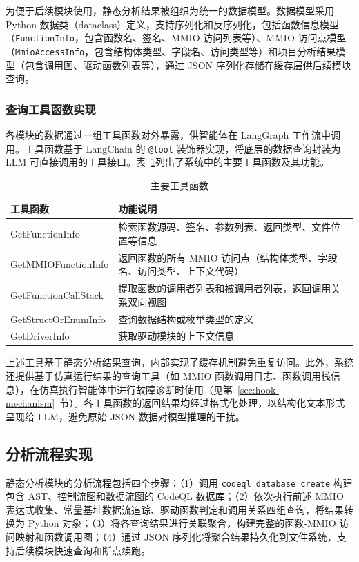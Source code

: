 为便于后续模块使用，静态分析结果被组织为统一的数据模型。数据模型采用 Python 数据类（dataclass）定义，支持序列化和反序列化，包括函数信息模型（\texttt{FunctionInfo}，包含函数名、签名、MMIO 访问列表等）、MMIO 访问点模型（\texttt{MmioAccessInfo}，包含结构体类型、字段名、访问类型等）和项目分析结果模型（包含调用图、驱动函数列表等），通过 JSON 序列化存储在缓存层供后续模块查询。

\subsubsection{查询工具函数实现}

各模块的数据通过一组工具函数对外暴露，供智能体在 LangGraph 工作流中调用。工具函数基于 LangChain 的 \texttt{@tool} 装饰器实现，将底层的数据查询封装为 LLM 可直接调用的工具接口。表~\ref{tab:tools}列出了系统中的主要工具函数及其功能。

\begin{table}[htbp]
\centering
\caption{主要工具函数}
\label{tab:tools}
\footnotesize
\setlength{\tabcolsep}{3pt}
\begin{tabular}{@{}lp{10.5cm}@{}}
\toprule
\textbf{工具函数} & \textbf{功能说明} \\
\midrule
GetFunctionInfo & 检索函数源码、签名、参数列表、返回类型、文件位置等信息 \\
GetMMIOFunctionInfo & 返回函数的所有 MMIO 访问点（结构体类型、字段名、访问类型、上下文代码） \\
GetFunctionCallStack & 提取函数的调用者列表和被调用者列表，返回调用关系双向视图 \\
GetStructOrEnumInfo & 查询数据结构或枚举类型的定义 \\
GetDriverInfo & 获取驱动模块的上下文信息 \\
\bottomrule
\end{tabular}
\end{table}

上述工具基于静态分析结果查询，内部实现了缓存机制避免重复访问。此外，系统还提供基于仿真运行结果的查询工具（如 MMIO 函数调用日志、函数调用栈信息），在仿真执行智能体中进行故障诊断时使用（见第~\ref{sec:hook-mechanism}~节）。各工具函数的返回结果均经过格式化处理，以结构化文本形式呈现给 LLM，避免原始 JSON 数据对模型推理的干扰。

\subsection{分析流程实现}

静态分析模块的分析流程包括四个步骤：（1）调用 \texttt{codeql database create} 构建包含 AST、控制流图和数据流图的 CodeQL 数据库；（2）依次执行前述 MMIO 表达式收集、常量基址数据流追踪、驱动函数判定和调用关系四组查询，将结果转换为 Python 对象；（3）将各查询结果进行关联聚合，构建完整的函数-MMIO 访问映射和函数调用图；（4）通过 JSON 序列化将聚合结果持久化到文件系统，支持后续模块快速查询和断点续跑。

